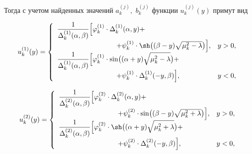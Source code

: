 Тогда с учетом найденных значений $a_k^{(j)},$ $b_k^{(j)}$ функции $u_k^{(j)}(y)$ примут вид

\begin{equation}

u_k^{(1)}(y)=

\left\{

\begin{array}{ll}\displaystyle 

\frac{1}{\Delta_k^{(1)}(\alpha,\beta)}\Big[\varphi_k^{(1)}\cdot

\Delta_k^{(1)}(\alpha,y)+ &

\\

\hspace{3cm}

+

\psi_k^{(1)}\cdot\sh\bigl((\beta-y)\sqrt{\mu_k^2-\lambda}\bigr)\Big], & y>0,\\

\displaystyle \frac{1}{\Delta_k^{(1)}(\alpha,\beta)}\Big[\varphi_k^{(1)}\cdot\sin\bigl((\alpha+y)\sqrt{\mu_k^2-\lambda}\bigr)+ &

\\

\hspace{3cm}

+

\psi_k^{(1)}\cdot\Delta_k^{(1)}(-y,\beta)\Big], & y<0,

\end{array}\right.\label{gim:eq-resh1}

\end{equation}

\begin{equation}

u_k^{(2)}(y)=\left\{\begin{array}{ll}

\displaystyle \frac{1}{\Delta_k^{(2)}(\alpha,\beta)} \Big[\varphi_k^{(2)}\cdot

\Delta_k^{(2)}(\alpha,y)+  &

\\

\hspace{3cm}

+

\psi_k^{(2)}\cdot\sin\bigl((\beta-y)\sqrt{\mu_k^2+\lambda}\bigr)\Big], & y>0,\\

\displaystyle \frac{1}{\Delta_k^{(2)}(\alpha,\beta)} \Big[\varphi_k^{(2)}\cdot\sh\bigl((\alpha+y)\sqrt{\mu_k^2+\lambda}\bigr)+ &

\\

\hspace{3cm}

+

\psi_k^{(2)}\cdot\Delta_k^{(2)}(-y,\beta)\Big], &  y<0,\end{array}\right.\label{gim:eq-resh2}

\end{equation}

